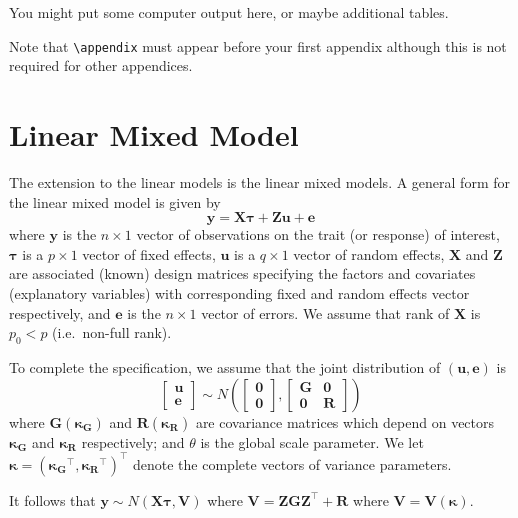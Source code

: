 \documentclass{sydneythesis}
\begin{document}
You might put some computer output here, or maybe additional tables.

Note that \texttt{\textbackslash{}appendix} must appear before your first appendix although this is not required for other appendices.

\chapter{Linear Mixed Model}\label{lmm}

The extension to the linear models is the linear mixed models. A general form for the linear mixed model is given by
\begin{equation}
\boldsymbol{y} = \boldsymbol{X}\boldsymbol{\tau} + \boldsymbol{Z}\boldsymbol{u} + \boldsymbol{e} \label{eq:lmm}
\end{equation}
where \(\boldsymbol{y}\) is the \(n\times 1\) vector of observations on the trait (or response) of interest, \(\boldsymbol{\tau}\) is a \(p \times 1\) vector of fixed effects, \(\boldsymbol{u}\) is a \(q \times 1\) vector of random effects, \(\boldsymbol{X}\) and \(\boldsymbol{Z}\) are associated (known) design matrices specifying the factors and covariates (explanatory variables) with corresponding fixed and random effects vector respectively, and \(\boldsymbol{e}\) is the \(n\times 1\) vector of errors. We assume that rank of \(\boldsymbol{X}\) is \(p_0 < p\) (i.e.~non-full rank).

To complete the
specification, we assume that the joint distribution of \((\boldsymbol{u}, \boldsymbol{e})\) is
\[ \begin{bmatrix}
\boldsymbol{u} \\
\boldsymbol{e} 
\end{bmatrix}
\sim N \left( 
\begin{bmatrix}
\boldsymbol{0} \\
\boldsymbol{0} 
\end{bmatrix}, 
\begin{bmatrix}
\boldsymbol{G} & \boldsymbol{0} \\
\boldsymbol{0} & \boldsymbol{R} 
\end{bmatrix}
\right)
\]
where \(\boldsymbol{G}(\boldsymbol{\kappa_G})\) and \(\boldsymbol{R}(\boldsymbol{\kappa_R})\) are covariance matrices which depend on vectors \(\boldsymbol{\kappa_G}\) and \(\boldsymbol{\kappa_R}\) respectively; and \(\theta\) is the global scale parameter.
We let \(\boldsymbol{\kappa} = (\boldsymbol{\kappa_G}^\top, \boldsymbol{\kappa_R}^\top)^\top\) denote the complete vectors of variance parameters.

It follows that \(\boldsymbol{y} \sim N(\boldsymbol{X\tau}, \boldsymbol{V})\) where \(\boldsymbol{V} = \boldsymbol{ZGZ}^\top + \boldsymbol{R}\) where \(\boldsymbol{V}=\boldsymbol{V}(\boldsymbol{\kappa})\).

\printbibliography[heading=bibintoc]
\end{document}

